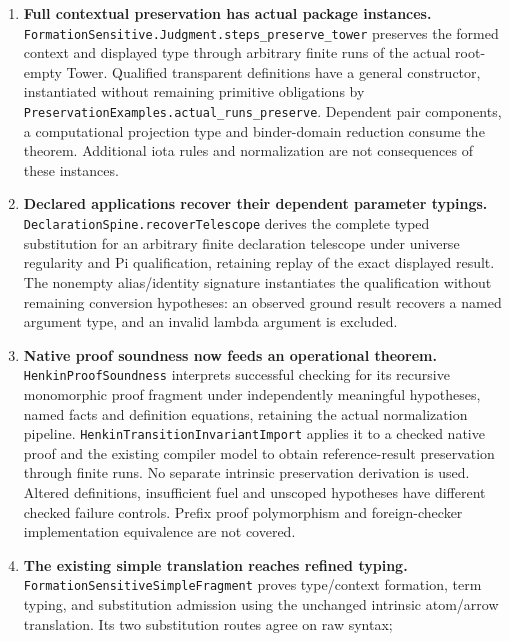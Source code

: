 \documentclass[11pt]{article}
\theoremstyle{definition}
\theoremstyle{remark}
\begin{document}
\begin{enumerate}
  instantiated for the nonempty package; \nolinkurl{FormationSensitive.Judgment.delta}
  independently preserves a constant's displayed type using its checked body.
  A three-step dependent specialization retains refined typing throughout.
\item \textbf{Full contextual preservation has actual package instances.}
  \nolinkurl{FormationSensitive.Judgment.steps_preserve_tower} preserves the
  formed context and displayed type through arbitrary finite runs of the
  actual root-empty Tower. Qualified transparent definitions have a general
  constructor, instantiated without remaining primitive obligations by
  \nolinkurl{PreservationExamples.actual_runs_preserve}. Dependent pair
  components, a computational projection type and binder-domain reduction
  consume the theorem. Additional iota rules and normalization are not
  consequences of these instances.
\item \textbf{Declared applications recover their dependent parameter typings.}
  \nolinkurl{DeclarationSpine.recoverTelescope} derives the complete typed
  substitution for an arbitrary finite declaration telescope under universe
  regularity and Pi qualification, retaining replay of the exact displayed
  result. The nonempty alias/identity signature instantiates the qualification
  without remaining conversion hypotheses: an observed ground result recovers a named
  argument type, and an invalid lambda argument is excluded.
\item \textbf{Native proof soundness now feeds an operational theorem.}
  \nolinkurl{HenkinProofSoundness} interprets successful checking for its
  recursive monomorphic proof fragment under independently meaningful
  hypotheses, named facts and definition equations, retaining the actual
  normalization pipeline. \nolinkurl{HenkinTransitionInvariantImport}
  applies it to a checked native proof and the existing compiler model to
  obtain reference-result preservation through finite runs. No separate
  intrinsic preservation derivation is used. Altered definitions, insufficient
  fuel and unscoped hypotheses have different checked failure controls.
  Prefix proof polymorphism and foreign-checker implementation equivalence
  are not covered.
\item \textbf{The existing simple translation reaches refined typing.}
  \nolinkurl{FormationSensitiveSimpleFragment} proves type/context formation,
  term typing, and substitution admission using the unchanged intrinsic
  atom/arrow translation. Its two substitution routes agree on raw syntax;

\end{enumerate}
\end{document}
